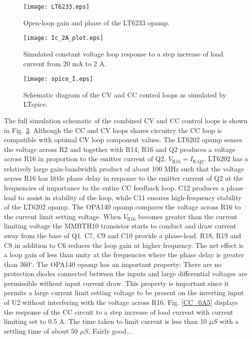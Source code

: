 \documentclass[a4paper,10pt, oneside]{article}
\begin{document}
\begin{figure}[H]
	\begin{centering}
	\texttt{[image: LT6233.eps]}
	\caption{Open-loop gain and phase of the LT6233 opamp.}\label{LT6233}
	\end{centering}
\end{figure}

\begin{figure}[H]
\begin{centering}	
	\texttt{[image: Ic\_2A\_plot.eps]}
	\caption{Simulated constant voltage loop response to a step increase of load current from 20 mA to 2 A.}\label{CV_2A_inc}
\end{centering}	
\end{figure}

\begin{figure}[H]
	\hspace*{-1cm}
	\begin{centering}
	\texttt{[image: spice\_I.eps]}
	\caption{Schematic diagram of the CV and CC control loops as simulated by LTspice.}\label{spice_I}
	\end{centering}
\end{figure}

The full simulation schematic of the combined CV and CC control loops is shown in Fig. \ref{spice_I}. Although the CC and CV loops shares circuitry the CC loop is compatible with optimal CV loop component values. The LT6202 opamp senses the voltage across R2 and together with R14, R16 and Q2 produces a voltage across R16 in proportion to the emitter current of Q2, $V_{\textrm{R16}} = I_{\textrm{E,Q2}}$. LT6202 has a relatively large gain-bandwidth product of about 100 MHz such that the voltage across R16 has little phase delay in response to the emitter current of Q2 at the frequencies of importance to the entire CC feedback loop. C12 produces a phase lead to assist in stability of the loop, while C11 ensures high-frequency stability of the LT6202 opamp. The OPA140 opamp compares the voltage across R16 to the current limit setting voltage. When $V_{\textrm{R16}}$ becomes greater than the current limiting voltage the MMBTH10 transistor starts to conduct and draw current away from the base of Q1. C7, C9 and C10 provide a phase-lead. R18, R19 and C8 in addition to C6 reduces the loop gain at higher frequency. The net effect is a loop gain of less than unity at the frequencies where the phase delay is greater than 360$^{\circ}$. The OPA140 opamp has an important property: There are no protection diodes connected between the inputs and large differential voltages are permissible without input current draw. This property is important since it permits a large current limit setting voltage to be present on the inverting input of U2 without interfering with the voltage across R16. Fig. \ref{CC_0A5} displays the response of the CC circuit to a step increase of load current with current limiting set to 0.5 A. The time taken to limit current is less than 10 $\mu S$ with a settling time of about 50 $\mu S$. Fairly good...
\end{document}

